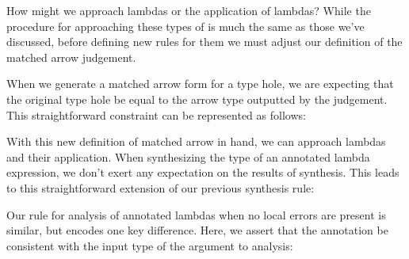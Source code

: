 How might we approach lambdas or the application of lambdas? While the procedure for approaching these types of is much the same as those we've discussed, before defining new rules for them we must adjust our definition of the matched arrow judgement. 

When we generate a matched arrow form for a type hole, we are expecting that the original type hole be equal to the arrow type outputted by the judgement. This straightforward constraint can be represented as follows:

\begin{mathpar}
\end{mathpar}

With this new definition of matched arrow in hand, we can approach lambdas and their application. When synthesizing the type of an annotated lambda expression, we don't exert any expectation on the results of synthesis. This leads to this straightforward extension of our previous synthesis rule:

\begin{mathpar}
\end{mathpar}

Our rule for analysis of annotated lambdas when no local errors are present is similar, but encodes one key difference. Here, we assert that the annotation \TMV be consistent with the input type of the argument to analysis:

\begin{mathpar}
\end{mathpar}

